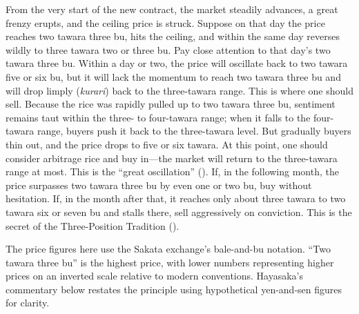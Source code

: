\begin{sokyubox}
{\small\itshape\color{sokyubar} }

\medskip
From the very start of the new contract, the market steadily advances, a
great frenzy erupts, and the ceiling price is struck. Suppose on that
day the price reaches two tawara three bu, hits the ceiling, and within
the same day reverses wildly to three tawara two or three bu. Pay close
attention to that day's two tawara three bu. Within a day or two, the
price will oscillate back to two tawara five or six bu, but it will lack
the momentum to reach two tawara three bu and will drop limply
(\textit{kurari}) back to the three-tawara range. This is where one
should sell. Because the rice was rapidly pulled up to two tawara three
bu, sentiment remains taut within the three- to four-tawara range; when
it falls to the four-tawara range, buyers push it back to the
three-tawara level. But gradually buyers thin out, and the price drops
to five or six tawara. At this point, one should consider arbitrage rice
and buy in---the market will return to the three-tawara range at most.
This is the ``great oscillation'' (). If, in the
following month, the price surpasses two tawara three bu by even one or
two bu, buy without hesitation. If, in the month after that, it reaches
only about three tawara to two tawara six or seven bu and stalls there,
sell aggressively on conviction. This is the secret of the
Three-Position Tradition ().
\end{sokyubox}

\begin{editorialnote}
The price figures here use the Sakata exchange's bale-and-bu notation.
``Two tawara three bu'' is the highest price, with lower numbers
representing higher prices on an inverted scale relative to modern
conventions. Hayasaka's commentary below restates the principle using
hypothetical yen-and-sen figures for clarity.
\end{editorialnote}

